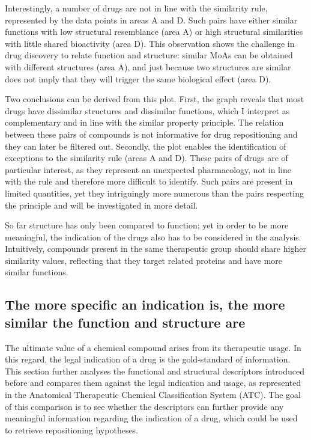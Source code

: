 Interestingly, a number of drugs are not in line with the similarity rule, represented by the data points in areas A and D. Such pairs have either similar functions with low structural resemblance (area A) or high structural similarities with little shared bioactivity (area D). This observation shows the challenge in drug discovery to relate function and structure: similar MoAs can be obtained with different structures (area A), and just because two structures are similar does not imply that they will trigger the same biological effect (area D).

Two conclusions can be derived from this plot. First, the graph reveals that most drugs have dissimilar structures and dissimilar functions, which I interpret as complementary and in line with the similar property principle. The relation between these pairs of compounds is not informative for drug repositioning and they can later be filtered out. Secondly, the plot enables the identification of exceptions to the similarity rule (areas A and D). These pairs of drugs are of particular interest, as they represent an unexpected pharmacology, not in line with the rule and therefore more difficult to identify. Such pairs are present in limited quantities, yet they intriguingly more numerous than the pairs respecting the principle and will be investigated in more detail.

So far structure has only been compared to function; yet in order to be more meaningful, the indication of the drugs also has to be considered in the analysis. Intuitively, compounds present in the same therapeutic group should share higher similarity values, reflecting that they target related proteins and have more similar functions.

\subsection{The more specific an indication is, the more similar the function and structure are}
The ultimate value of a chemical compound arises from its therapeutic usage. In this regard, the legal indication of a drug is the gold-standard of information. This section further analyses the functional and structural descriptors introduced before and compares them against the legal indication and usage, as represented in the Anatomical Therapeutic Chemical Classification System (ATC). The goal of this comparison is to see whether the descriptors can further provide any meaningful information regarding the indication of a drug, which could be used to retrieve repositioning hypotheses.

